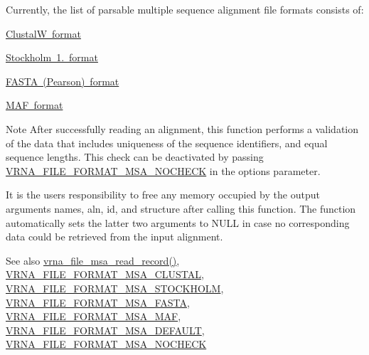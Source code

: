 Currently, the list of parsable multiple sequence alignment file formats consists of\+:
\begin{DoxyItemize}
\item \mbox{\hyperlink{file_formats_msa-formats-clustal}{ClustalW format}}
\item \mbox{\hyperlink{file_formats_msa-formats-stockholm}{Stockholm 1. format}}
\item \mbox{\hyperlink{file_formats_msa-formats-fasta}{F\+A\+S\+TA (Pearson) format}}
\item \mbox{\hyperlink{file_formats_msa-formats-maf}{M\+AF format}}
\end{DoxyItemize}\begin{DoxyNote}{Note}
After successfully reading an alignment, this function performs a validation of the data that includes uniqueness of the sequence identifiers, and equal sequence lengths. This check can be deactivated by passing \mbox{\hyperlink{group__file__utils_ga229fb3778ecabea4782902b69fa48fd1}{V\+R\+N\+A\+\_\+\+F\+I\+L\+E\+\_\+\+F\+O\+R\+M\+A\+T\+\_\+\+M\+S\+A\+\_\+\+N\+O\+C\+H\+E\+CK}} in the {\ttfamily options} parameter.

It is the users responsibility to free any memory occupied by the output arguments {\ttfamily names}, {\ttfamily aln}, {\ttfamily id}, and {\ttfamily structure} after calling this function. The function automatically sets the latter two arguments to {\ttfamily N\+U\+LL} in case no corresponding data could be retrieved from the input alignment.
\end{DoxyNote}
\begin{DoxySeeAlso}{See also}
\mbox{\hyperlink{group__file__utils_ga59204cd1daa4927f5127cc65a2886efd}{vrna\+\_\+file\+\_\+msa\+\_\+read\+\_\+record()}}, \mbox{\hyperlink{group__file__utils_ga79a23de2c7249f2cccd762e475c81859}{V\+R\+N\+A\+\_\+\+F\+I\+L\+E\+\_\+\+F\+O\+R\+M\+A\+T\+\_\+\+M\+S\+A\+\_\+\+C\+L\+U\+S\+T\+AL}}, \mbox{\hyperlink{group__file__utils_ga62be992445cd8ab2ad7a8fded944338b}{V\+R\+N\+A\+\_\+\+F\+I\+L\+E\+\_\+\+F\+O\+R\+M\+A\+T\+\_\+\+M\+S\+A\+\_\+\+S\+T\+O\+C\+K\+H\+O\+LM}}, \mbox{\hyperlink{group__file__utils_gacf6274a2c825f34e4131404665b00604}{V\+R\+N\+A\+\_\+\+F\+I\+L\+E\+\_\+\+F\+O\+R\+M\+A\+T\+\_\+\+M\+S\+A\+\_\+\+F\+A\+S\+TA}}, \mbox{\hyperlink{group__file__utils_gab3186d774c01570d2a47d0308eec4927}{V\+R\+N\+A\+\_\+\+F\+I\+L\+E\+\_\+\+F\+O\+R\+M\+A\+T\+\_\+\+M\+S\+A\+\_\+\+M\+AF}}, \mbox{\hyperlink{group__file__utils_ga4acc255373831856a8417b68de8a94c0}{V\+R\+N\+A\+\_\+\+F\+I\+L\+E\+\_\+\+F\+O\+R\+M\+A\+T\+\_\+\+M\+S\+A\+\_\+\+D\+E\+F\+A\+U\+LT}}, \mbox{\hyperlink{group__file__utils_ga229fb3778ecabea4782902b69fa48fd1}{V\+R\+N\+A\+\_\+\+F\+I\+L\+E\+\_\+\+F\+O\+R\+M\+A\+T\+\_\+\+M\+S\+A\+\_\+\+N\+O\+C\+H\+E\+CK}}
\end{DoxySeeAlso}

